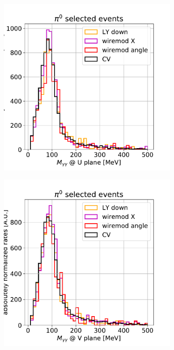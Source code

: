 \documentclass[a4paper]{article}
\begin{document}
\begin{figure}[H] 
\begin{center}
    \begin{subfigure}[b]{0.3\textwidth}
    \centering
    \includegraphics[width=1.00\textwidth]{detsys/pi0_mass_U01162020_bnbnumu.pdf}
    \end{subfigure}
    \begin{subfigure}[b]{0.3\textwidth}
    \centering
    \includegraphics[width=1.00\textwidth]{detsys/pi0_mass_V01162020_bnbnumu.pdf}

\end{subfigure}
\end{center}
\end{figure}
\end{document}
